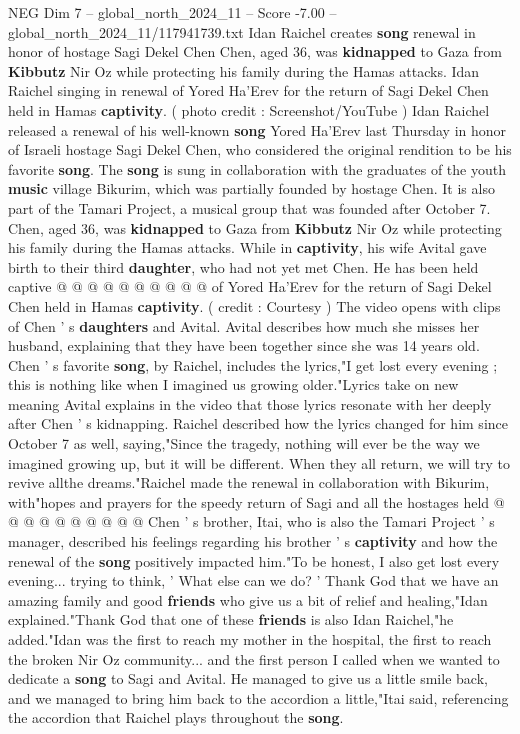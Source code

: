 \begin{textsample}{NEG Dim 7 – global\_north\_2024\_11 – Score -7.00 – global\_north\_2024\_11/117941739.txt}  \label{ex:f7_neg_255}
Idan Raichel creates \textbf{song} renewal in honor of hostage Sagi Dekel Chen Chen, aged 36, was \textbf{kidnapped} to Gaza from \textbf{Kibbutz} Nir Oz while protecting his family during the Hamas attacks.
Idan Raichel singing in renewal of Yored Ha'Erev for the return of Sagi Dekel Chen held in Hamas \textbf{captivity}. ( photo credit : Screenshot/YouTube ) Idan Raichel released a renewal of his well-known \textbf{song} Yored Ha'Erev last Thursday in honor of Israeli hostage Sagi Dekel Chen, who considered the original rendition to be his favorite \textbf{song}.
The \textbf{song} is sung in collaboration with the graduates of the youth \textbf{music} village Bikurim, which was partially founded by hostage Chen.
It is also part of the Tamari Project, a musical group that was founded after October 7.
Chen, aged 36, was \textbf{kidnapped} to Gaza from \textbf{Kibbutz} Nir Oz while protecting his family during the Hamas attacks.
While in \textbf{captivity}, his wife Avital gave birth to their third \textbf{daughter}, who had not yet met Chen.
He has been held captive @ @ @ @ @ @ @ @ @ @ of Yored Ha'Erev for the return of Sagi Dekel Chen held in Hamas \textbf{captivity}. ( credit : Courtesy ) The video opens with clips of Chen ' s \textbf{daughters} and Avital.
Avital describes how much she misses her husband, explaining that they have been together since she was 14 years old.
Chen ' s favorite \textbf{song}, by Raichel, includes the lyrics,"I get lost every evening ; this is nothing like when I imagined us growing older."Lyrics take on new meaning Avital explains in the video that those lyrics resonate with her deeply after Chen ' s kidnapping.
Raichel described how the lyrics changed for him since October 7 as well, saying,"Since the tragedy, nothing will ever be the way we imagined growing up, but it will be different.
When they all return, we will try to revive allthe dreams."Raichel made the renewal in collaboration with Bikurim, with"hopes and prayers for the speedy return of Sagi and all the hostages held @ @ @ @ @ @ @ @ @ @ Chen ' s brother, Itai, who is also the Tamari Project ' s manager, described his feelings regarding his brother ' s \textbf{captivity} and how the renewal of the \textbf{song} positively impacted him."To be honest, I also get lost every evening... trying to think, ' What else can we do? ' Thank God that we have an amazing family and good \textbf{friends} who give us a bit of relief and healing,"Idan explained."Thank God that one of these \textbf{friends} is also Idan Raichel,"he added."Idan was the first to reach my mother in the hospital, the first to reach the broken Nir Oz community... and the first person I called when we wanted to dedicate a \textbf{song} to Sagi and Avital.
He managed to give us a little smile back, and we managed to bring him back to the accordion a little,"Itai said, referencing the accordion that Raichel plays throughout the \textbf{song}.

\end{textsample}
